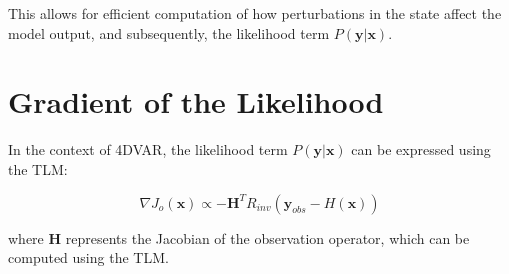 \documentclass{article}
\begin{document}
This allows for efficient computation of how perturbations in the state affect the model output, and subsequently, the likelihood term \( P(\mathbf{y} | \mathbf{x}) \).

\section{Gradient of the Likelihood}

In the context of 4DVAR, the likelihood term \( P(\mathbf{y} | \mathbf{x}) \) can be expressed using the TLM:

\[
\nabla J_o(\mathbf{x}) \propto -\mathbf{H}^T R_{inv} (\mathbf{y}_{obs} - H(\mathbf{x}))
\]

where \( \mathbf{H} \) represents the Jacobian of the observation operator, which can be computed using the TLM.
\end{document}
